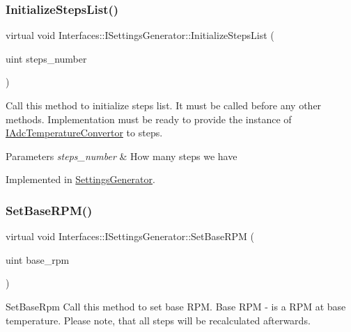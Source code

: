 \subsubsection{\texorpdfstring{Initialize\+Steps\+List()}{InitializeStepsList()}}
{\footnotesize\ttfamily virtual void Interfaces\+::\+I\+Settings\+Generator\+::\+Initialize\+Steps\+List (\begin{DoxyParamCaption}\item[{uint}]{steps\+\_\+number }\end{DoxyParamCaption})\hspace{0.3cm}{\ttfamily [pure virtual]}}



Call this method to initialize steps list. It must be called before any other methods. Implementation must be ready to provide the instance of \hyperlink{class_interfaces_1_1_i_adc_temperature_convertor}{I\+Adc\+Temperature\+Convertor} to steps. 


\begin{DoxyParams}{Parameters}
{\em steps\+\_\+number} & How many steps we have \\
\hline
\end{DoxyParams}


Implemented in \hyperlink{class_settings_generator_a84b81d11cb5f83d4066e73a03acfc143}{Settings\+Generator}.

\mbox{\label{class_interfaces_1_1_i_settings_generator_a4caf07447d0930440d9f21318892244c}} 
\subsubsection{\texorpdfstring{Set\+Base\+R\+P\+M()}{SetBaseRPM()}}
{\footnotesize\ttfamily virtual void Interfaces\+::\+I\+Settings\+Generator\+::\+Set\+Base\+R\+PM (\begin{DoxyParamCaption}\item[{uint}]{base\+\_\+rpm }\end{DoxyParamCaption})\hspace{0.3cm}{\ttfamily [pure virtual]}}



Set\+Base\+Rpm Call this method to set base R\+PM. Base R\+PM -\/ is a R\+PM at base temperature. Please note, that all steps will be recalculated afterwards. 


